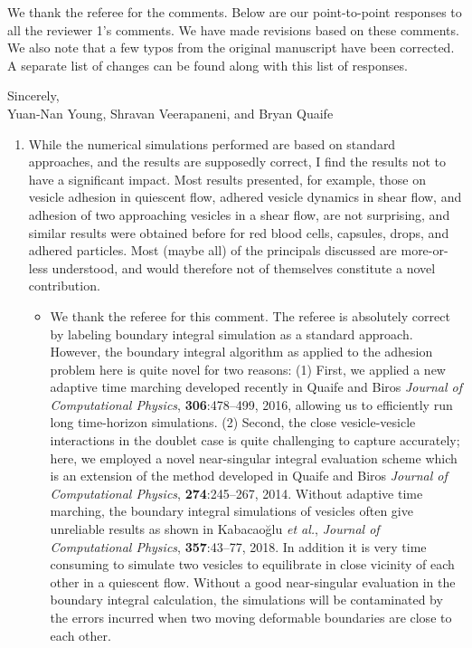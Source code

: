 \documentclass[11pt]{article}
\newcommand{\comment}[1]{{\color{blue} #1}}
\begin{document}
\noindent
We thank the referee for the comments.  Below are our point-to-point
responses to all the reviewer 1's comments.  We have made revisions
based on these comments.  We also note that a few typos from the
original manuscript have been corrected.  A separate list of changes can
be found along with this list of responses.

\medskip
\noindent 
Sincerely, \\ \noindent
Yuan-Nan Young, Shravan Veerapaneni, and Bryan Quaife

\vspace{20pt}
\noindent

\begin{enumerate}
\item\comment{While the numerical simulations performed are based on standard
approaches, and the results are supposedly correct, I find the results
not to have a significant impact. Most results presented, for example,
those on vesicle adhesion in quiescent flow, adhered vesicle dynamics in
shear flow, and adhesion of two approaching vesicles in a shear flow,
are not surprising, and similar results were obtained before for red
blood cells, capsules, drops, and adhered particles. Most (maybe all) of
the principals discussed are more-or-less understood, and would
therefore not of themselves constitute a novel contribution.}
\begin{itemize}
\item We thank the referee for this comment. The referee is absolutely
  correct by labeling boundary integral simulation as a standard
    approach. However, the boundary integral algorithm as applied to the
    adhesion problem here is quite novel for two reasons: (1) First, we
    applied a new adaptive time marching developed recently in Quaife
    and Biros {\em Journal of Computational Physics}, {\bf
    306}:478--499, 2016, allowing us to efficiently run long
    time-horizon simulations. (2) Second, the close vesicle-vesicle
    interactions in the doublet case is quite challenging to capture
    accurately; here, we employed a novel near-singular integral
    evaluation scheme which is an extension of the method developed in
    Quaife and Biros {\em Journal of Computational Physics}, {\bf
    274}:245--267, 2014. Without adaptive time marching, the boundary
    integral simulations of vesicles often give unreliable results as
    shown in Kabacao\u{g}lu {\em et al.}, {\em Journal of Computational
    Physics}, {\bf 357}:43--77, 2018. In addition it is very time
    consuming to simulate two vesicles to equilibrate in close vicinity
    of each other in a quiescent flow.  Without a good near-singular
    evaluation in the boundary integral calculation, the simulations
    will be contaminated by the errors incurred when two moving
    deformable boundaries are close to each other.
  

\end{itemize}
\end{enumerate}
\end{document}
